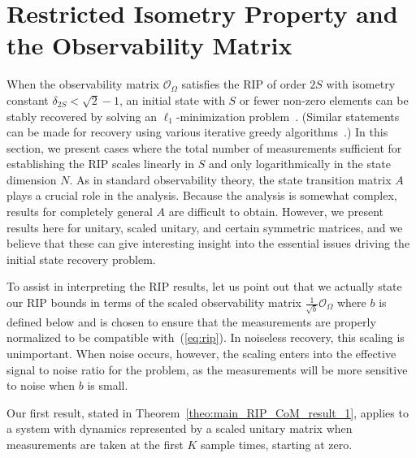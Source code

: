 \documentclass[11pt,draftcls,onecolumn]{IEEEtran}
\def \ok {{\mathcal{O}_{\Omega}}}
\begin{document}
\section{Restricted Isometry Property and the Observability Matrix}
\label{sec:rip}

When the observability matrix $\ok$ satisfies the RIP of order $2S$ with isometry constant $\delta_{2S} < \sqrt{2}-1$, an initial state with $S$ or fewer non-zero elements can be stably recovered by solving an $\ell_{1}$-minimization problem~\cite{CandesRIP}. (Similar statements can be made for recovery using various iterative greedy algorithms~\cite{tropp2007signal,needell2009uniform,needell2009cosamp,dai2009subspace}.) In this section, we present cases where the total number of measurements sufficient for establishing the RIP scales linearly in $S$ and only logarithmically in the state dimension $N$.
As in standard observability theory, the state transition matrix $A$ plays a crucial role in the analysis. Because the analysis is somewhat complex, results for completely general $A$ are difficult to obtain. However, we present results here for unitary, scaled unitary, and certain symmetric matrices, and we believe that these can give interesting insight into the essential issues driving the initial state recovery problem.

To assist in interpreting the \ac{RIP} results, let us point out that we actually state our \ac{RIP} bounds in terms of the scaled observability matrix $\frac{1}{\sqrt{b}}\ok$ where $b$ is defined below and is chosen to ensure that
the measurements are properly normalized to be compatible with~(\ref{eq:rip}). In noiseless recovery, this scaling is unimportant. When noise occurs, however, the scaling enters into the effective signal to noise ratio for the problem, as the measurements will be more sensitive to noise when $b$ is small.

Our first result, stated in Theorem~\ref{theo:main_RIP_CoM_result_1}, applies to a system with dynamics represented by a scaled unitary matrix when measurements are taken at the first $K$ sample times, starting at zero.
\end{document}
